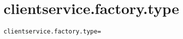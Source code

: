 \section{clientservice.factory.type}
\label{configuration:ClientserviceFactoryType}
\AvailableInCsharpOnly{\TODO}
\begin{lstlisting}[style=Props,caption={Usage example for \textit{clientservice.factory.type}}]
clientservice.factory.type=
\end{lstlisting}